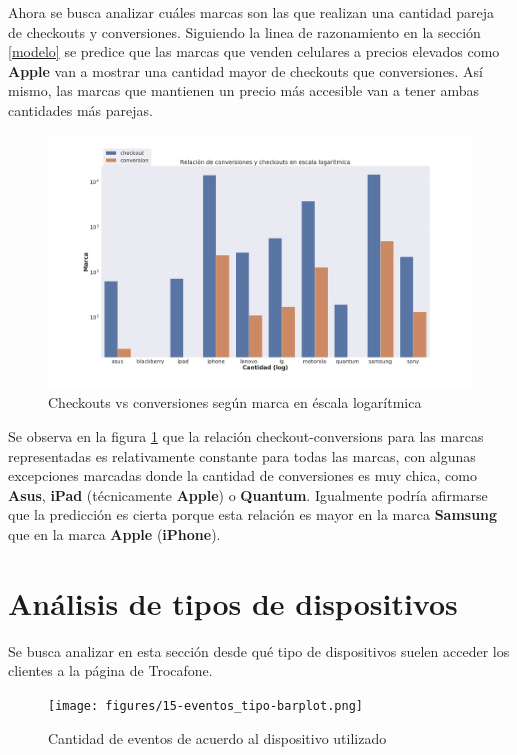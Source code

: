 \documentclass[a4paper]{article}
\begin{document}
Ahora se busca analizar cuáles marcas son las que realizan una cantidad pareja de checkouts y conversiones. Siguiendo la linea de razonamiento en la sección \ref{modelo} se predice que las marcas que venden celulares a precios elevados como \textbf{Apple} van a mostrar una cantidad mayor de checkouts que conversiones. Así mismo, las marcas que mantienen un precio más accesible van a tener ambas cantidades más parejas. 

\begin{figure}[h!]
	\includegraphics[width=\linewidth]{figures/142-conversiones_checkouts_marca-barplot.png}
	\caption{Checkouts vs conversiones según marca en éscala logarítmica}
	\label{fig:brands}
\end{figure}

Se observa en la figura \ref{fig:brands} que la relación checkout-conversions para las marcas representadas es relativamente constante para todas las marcas, con algunas excepciones marcadas donde la cantidad de conversiones es muy chica, como \textbf{Asus}, \textbf{iPad} (técnicamente \textbf{Apple}) o \textbf{Quantum}. Igualmente podría afirmarse que la predicción es cierta porque esta relación es mayor en la marca \textbf{Samsung} que en la marca \textbf{Apple} (\textbf{iPhone}).

\section{Análisis de tipos de dispositivos}

Se busca analizar en esta sección desde qué tipo de dispositivos suelen acceder los clientes a la página de Trocafone.

\begin{figure}[h!]
	\texttt{[image: figures/15-eventos\_tipo-barplot.png]}
	\caption{Cantidad de eventos de acuerdo al dispositivo utilizado}
	\label{fig:dispositivos}
\end{figure}
\end{document}
